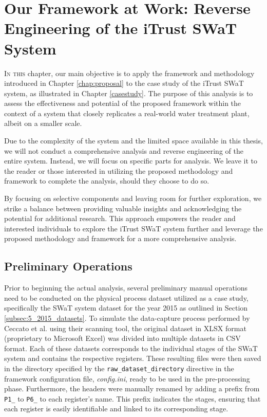 \chapter[Our Framework at Work on the iTrust SWaT System]{Our Framework at Work: Reverse Engineering of the iTrust SWaT System}
\label{application}
\linenumbers

\lettrine{I}{n this} chapter, our main objective is to apply the framework and methodology introduced in Chapter \ref{chap:proposal} to the case study of the iTrust SWaT system, as illustrated in Chapter \ref{casestudy}. The purpose of this analysis is to assess the effectiveness and potential of the proposed framework within the context of a system that closely replicates a real-world water treatment plant, albeit on a smaller scale.

\bigskip
Due to the complexity of the system and the limited space available in this thesis, we will not conduct a comprehensive analysis and reverse engineering of the entire system. Instead, we will focus on specific parts for analysis. We leave it to the reader or those interested in utilizing the proposed methodology and framework to complete the analysis, should they choose to do so.

By focusing on selective components and leaving room for further exploration, we strike a balance between providing valuable insights and acknowledging the potential for additional research. This approach empowers the reader and interested individuals to explore the iTrust SWaT system further and leverage the proposed methodology and framework for a more comprehensive analysis.

\section{Preliminary Operations}
\label{sec:6_preliminar_operations}
Prior to beginning the actual analysis, several preliminary manual operations need to be conducted on the physical process dataset utilized as a case study, specifically the SWaT system dataset for the year 2015 as outlined in Section \ref{subsec:5_2015_datasets}. To simulate the data-capture process performed by Ceccato et al. using their scanning tool, the original dataset in XLSX format (proprietary to Microsoft Excel) was divided into multiple datasets in CSV format. Each of these datasets corresponds to the individual stages of the SWaT system and contains the respective registers. These resulting files were then saved in the directory specified by the \texttt{raw\_dataset\_directory} directive in the framework configuration file, \textit{config.ini}, ready to be used in the pre-processing phase.
Furthermore, the headers were manually renamed by adding a prefix from \texttt{P1\_} to \texttt{P6\_} to each register's name. This prefix indicates the stages, ensuring that each register is easily identifiable and linked to its corresponding stage.

